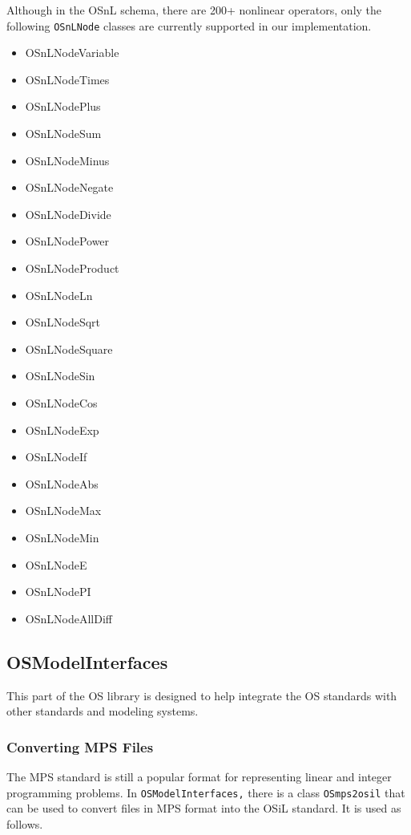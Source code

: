 \documentclass[11pt]{article}
\renewcommand{\_}{{\char"5F}}
\renewcommand{\{}{{\char"7B}}
\renewcommand{\}}{{\char"7D}}
\renewcommand{\^}{{\char"0D}}
\renewcommand{\'}{{\char"0D}}
\begin{document}
\begin{enumerate}[Step 1:]
Although in the OSnL schema, there are 200+ nonlinear operators, only the following {\tt  OSnLNode} classes are currently supported in our implementation.

\begin{itemize}
\item OSnLNodeVariable
\item OSnLNodeTimes
\item OSnLNodePlus
\item OSnLNodeSum
\item OSnLNodeMinus
\item OSnLNodeNegate
\item OSnLNodeDivide
\item OSnLNodePower
\item OSnLNodeProduct
\item OSnLNodeLn
\item OSnLNodeSqrt
\item OSnLNodeSquare
\item OSnLNodeSin
\item OSnLNodeCos
\item OSnLNodeExp
\item OSnLNodeIf
\item OSnLNodeAbs
\item OSnLNodeMax
\item OSnLNodeMin
\item OSnLNodeE
\item OSnLNodePI
\item OSnLNodeAllDiff
\end{itemize}


\subsection{OSModelInterfaces}\label{section:osmodelinterfaces}

This part of the OS library is designed to help integrate the OS standards with other standards and modeling systems.

\subsubsection{Converting MPS Files}

The MPS standard is still a popular format for representing linear and integer programming problems.  
In {\tt OSModelInterfaces,} there is a class {\tt OSmps2osil} that can be used 
to convert files in MPS format into the OSiL standard. It is used as follows.


\end{enumerate}
\end{document}
